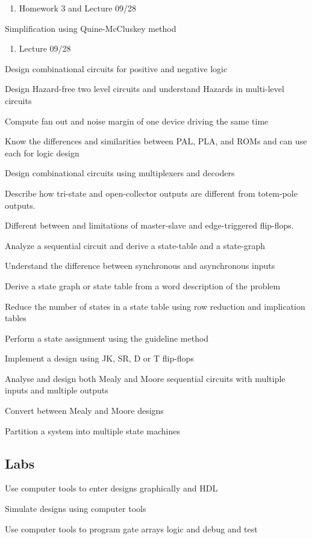 \documentclass{article}
\newcommand{\cmark}{\ding{51}}%
\newcommand{\done}{\rlap{$\square$}{\raisebox{2pt}{\large\hspace{1pt}\cmark}}%
  \hspace{-2.5pt}}
\begin{document}
\begin{todolist}
    \begin{enumerate}
      \item Homework 3 and Lecture 09/28 
    \end{enumerate}
  \item[\done]  Simplification using Quine-McCluskey method
    \begin{enumerate}
    \item Lecture 09/28 
    \end{enumerate}
  \item  Design combinational circuits for positive and negative logic
  \item  Design Hazard-free two level circuits and understand Hazards in multi-level circuits
  \item  Compute fan out and noise margin of one device driving the same time
  \item  Know the differences and similarities between PAL, PLA, and ROMs and can use each for logic design
  \item Design combinational circuits using multiplexers and decoders
  \item Describe how tri-state and open-collector outputs are different from totem-pole outputs.
  \item Different between and limitations of master-slave and edge-triggered flip-flops.
  \item Analyze a sequential circuit and derive a state-table and a state-graph
  \item Understand the difference between synchronous and asynchronous inputs
  \item Derive a state graph or state table from a word description of the problem
  \item Reduce the number of states in a state table using row reduction and implication tables
  \item Perform a state assignment using the guideline method
  \item Implement a design using JK, SR, D or T flip-flops
  \item Analyse and design both Mealy and Moore sequential circuits with multiple inputs and multiple outputs
  \item Convert between Mealy and Moore designs
  \item Partition a system into multiple state machines
\end{todolist}

\subsection{Labs}
\begin{todolist}
  \item[\done] Use computer tools to enter designs graphically and HDL
  \item Simulate designs using computer tools
  \item Use computer tools to program gate arrays logic and debug and test
\end{todolist}


%
%
\end{document}

